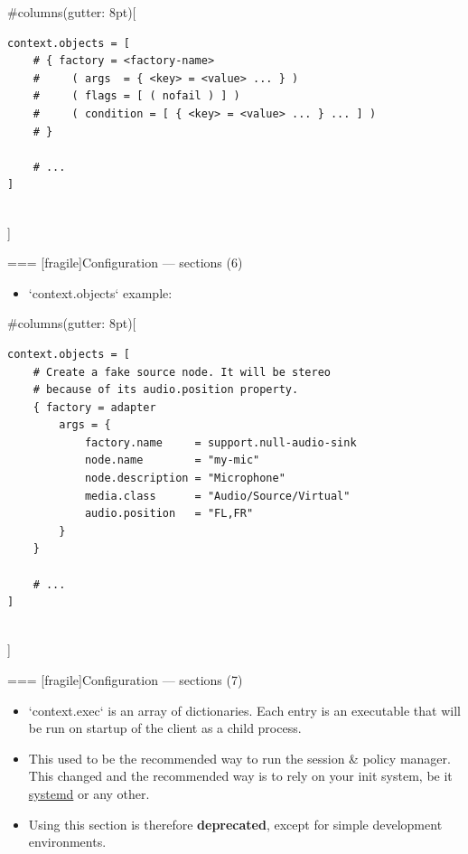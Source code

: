   
#columns(gutter: 8pt)[
    \begin{block}{}
      \fontsize{8}{8}\selectfont
        \begin{verbatim}
context.objects = [
    # { factory = <factory-name>
    #     ( args  = { <key> = <value> ... } )
    #     ( flags = [ ( nofail ) ] )
    #     ( condition = [ { <key> = <value> ... } ... ] )
    # }

    # ...
]
        \end{verbatim}
      \end{block}
  \\]





=== [fragile]{Configuration — sections (6)}

  \begin{itemize}
  \item `context.objects` example:
  \end{itemize}

  
#columns(gutter: 8pt)[
    \begin{block}{}
      \fontsize{8}{8}\selectfont
        \begin{verbatim}
context.objects = [
    # Create a fake source node. It will be stereo
    # because of its audio.position property.
    { factory = adapter
        args = {
            factory.name     = support.null-audio-sink
            node.name        = "my-mic"
            node.description = "Microphone"
            media.class      = "Audio/Source/Virtual"
            audio.position   = "FL,FR"
        }
    }

    # ...
]
        \end{verbatim}
      \end{block}
  \\]





=== [fragile]{Configuration — sections (7)}

  \begin{itemize}

  \item `context.exec` is an array of dictionaries. Each entry
    is an executable that will be run on startup of the client as a
    child process.

  \item This used to be the recommended way to run the session \&
    policy manager. This changed and the recommended way is to rely on
    your init system, be it \href{https://systemd.io/}{systemd} or any
    other.

  \item Using this section is therefore \textbf{deprecated}, except for
    simple development environments.

  \end{itemize}

